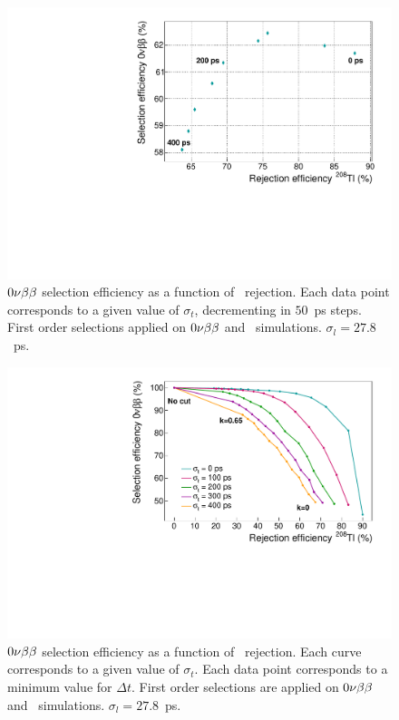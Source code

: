 \begin{figure}[!h]
  \centering
  \includegraphics[width=13cm]{timedifference/fig_timediff/efficiency_proba.pdf}
  \caption{$0\nu\beta\beta$ selection efficiency as a function of \Tl\ rejection.
    Each data point corresponds to a given value of $\sigma_{t}$, decrementing in $50$~ps steps.
    First order selections applied on $0\nu\beta\beta$ and \Tl\ simulations.
    $\sigma_{l}=27.8$~ps.
    \label{fig:eff_proba_sigma}}
\end{figure}

\begin{figure}[!h]
  \centering
  \includegraphics[width=13cm]{timedifference/fig_timediff/compare_sigma_cut_delta_t.pdf}
  \caption{$0\nu\beta\beta$ selection efficiency as a function of \Tl\ rejection.
    Each curve corresponds to a given value of $\sigma_{t}$.
    Each data point corresponds to a minimum value for $\Delta t$.
    First order selections are applied on $0\nu\beta\beta$ and \Tl\ simulations.
    $\sigma_{l}=27.8$~ps.
    \label{fig:eff_cut_delta_t_sigma}}
\end{figure}



